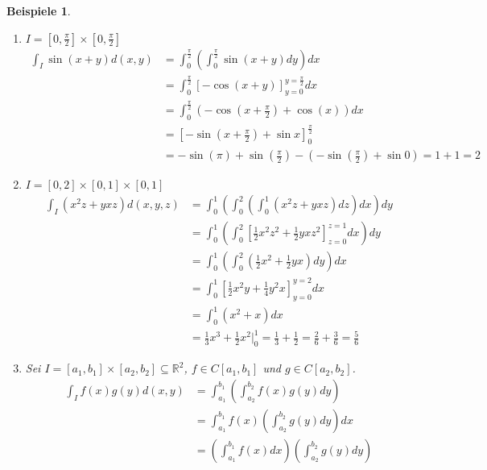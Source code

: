 \documentclass[12pt]{extreport} %
\newcommand{\R}{\mathbb{R}}
\theoremstyle{named}
\theoremstyle{nnamed}
\theoremstyle{itshape}
\theoremstyle{normal}
\newtheorem*{beispiele}{Beispiele}
\begin{document}
\begin{beispiele} ~\
	\begin{enumerate}
		\item $I = \left[0, \frac{\pi}{2}\right] \times \left[0, \frac{\pi}{2}\right]$
			\begin{align*}
				\int_{I} \sin(x+y) d(x, y) & = \int_{0}^{\frac{\pi}{2}} \left( \int_{0}^{\frac{\pi}{2}} \sin(x + y) dy \right) dx \\
				&= \int_{0}^{\frac{\pi}{2}} \left[ - \cos(x+y)\right]_{y=0}^{y = \frac{\pi}{2}} dx \\
				& = \int_{0}^{\frac{\pi}{2}} \left( - \cos\left(x+\frac{\pi}{2}\right) + \cos(x) \right) dx \\
				& = \left[ - \sin\left( x + \frac{\pi}{2} \right) + \sin x \right]_{0}^{\frac{\pi}{2}} \\
				& = - \sin (\pi) + \sin \left( \frac{\pi}{2} \right) - \left( -\sin \left( \frac{\pi}{2} \right) + \sin 0 \right) = 1 + 1 = 2
			\end{align*}
		\item $I = [0, 2] \times [0, 1] \times [0, 1]$
			\begin{align*}
				\int_{I} \left( x^{2} z + y x z \right) d(x,y,z) & = \int_{0}^{1} \left( \int_{0}^{2} \left( \int_{0}^{1} \left( x^{2} z + yxz \right) dz \right) dx \right) dy \\
				& = \int_{0}^{1} \left( \int_{0}^{2} \left[ \frac{1}{2} x^{2} z^{2} + \frac{1}{2} y x z^{2} \right]_{z=0}^{z=1} dx \right) dy \\
				& = \int_{0}^{1} \left( \int_{0}^{2} \left( \frac{1}{2} x^{2} + \frac{1}{2} y x \right) dy \right) dx \\		
				& = \int_{0}^{1} \left[ \frac{1}{2} x^{2} y + \frac{1}{4} y^{2} x \right]_{y=0}^{y=2} dx \\		
				& = \int_{0}^{1} \left( x^{2} + x \right) dx \\	
				& = \frac{1}{3} x^{3} + \frac{1}{2} x^{2} \Big|_{0}^{1} = \frac{1}{3} + \frac{1}{2} = \frac{2}{6} + \frac{3}{6} = \frac{5}{6}
			\end{align*}
		\item Sei $I = [a_{1}, b_{1}] \times [a_{2}, b_{2}] \subseteq \R^{2}$, $f \in C[a_{1}, b_{1}]$ und $g \in C[a_{2}, b_{2}]$.
			\begin{align*}
				\int_{I} f(x) g(y) d(x, y) & = \int_{a_{1}}^{b_{1}} \left( \int_{a_{2}}^{b_{2}} f(x) g(y) dy \right) \\
				& = \int_{a_{1}}^{b_{1}} f(x) \left( \int_{a_{2}}^{b_{2}} g(y) dy \right) dx \\
				& = \left( \int_{a_{1}}^{b_{1}} f(x) dx \right) \left( \int_{a_{2}}^{b_{2}} g(y) dy \right)
			\end{align*}
	\end{enumerate}	
\end{beispiele}
\end{document}
